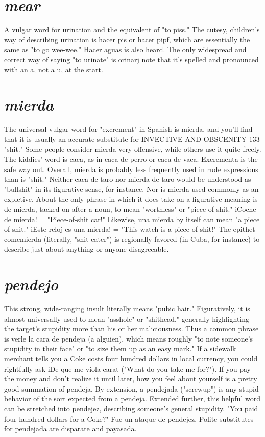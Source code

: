 \documentclass[14pt,a4paper,oneside]{memoir}
\begin{document}
\section{\emph{mear}}

A vulgar word for urination and the equivalent of "to piss."
The cutesy, children's way of describing urination is hacer pis or hacer
pipf, which are essentially the same as "to go wee-wee." Hacer aguas
is also heard. The only widespread and correct way of saying "to urinate" is orinarj note that it's spelled and pronounced with an a, not a
u, at the start.

\section{\emph{mierda}}

The universal vulgar word for "excrement" in Spanish is
mierda, and you'll find that it is usually an accurate substitute for
INVECTIVE AND OBSCENITY 133
"shit." Some people consider mierda very offensive, while others use it
quite freely. The kiddies' word is caca, as in caca de perro or caca de
vaca. Excrementa is the safe way out.
Overall, mierda is probably less frequently used in rude expressions than is "shit." Neither caca de taro nor mierda de taro
would be understood as "bullshit" in its figurative sense, for instance.
Nor is mierda used commonly as an expletive. About the only phrase
in which it does take on a figurative meaning is de mierda, tacked
on after a noun, to mean "worthless" or "piece of shit." iCoche de
mierda! = "Piece-of-shit car!" Likewise, una mierda by itself can
mean "a piece of shit." iEste reloj es una mierda! = "This watch is a
piece of shit!" The epithet comemierda (literally, "shit-eater") is regionally favored (in Cuba, for instance) to describe just about anything
or anyone disagreeable.

\section{\emph{pendejo}}

This strong, wide-ranging insult literally means "pubic hair."
Figuratively, it is almost universally used to mean "asshole" or "shithead," generally highlighting the target's stupidity more than his or
her maliciousness. Thus a common phrase is verle la cara de pendeja
(a alguien), which means roughly "to note someone's stupidity in their
face" or "to size them up as an easy mark." If a sidewalk merchant
tells you a Coke costs four hundred dollars in local currency, you could
rightfully ask iDe que me viola carat ("What do you take me for?"). If
you pay the money and don't realize it until later, how you feel about
yourself is a pretty good summation of pendeja. By extension, a pendejada ("screwup") is any stupid behavior of the sort expected from a
pendeja. Extended further, this helpful word can be stretched into pendejez, describing someone's general stupidity. "You paid four hundred
dollars for a Coke?" Fue un ataque de pendejez. Polite substitutes for
pendejada are disparate and payasada.
\end{document}
